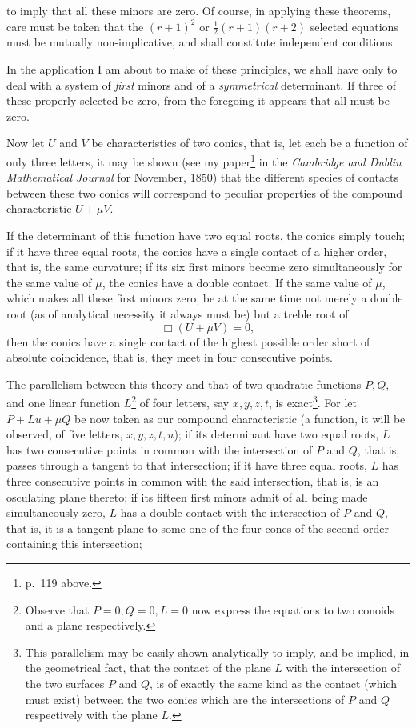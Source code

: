 \documentclass[11pt]{article}
\newcommand{\sourcepage}[1]{\marginpar{\scriptsize p.~#1}}
\begin{document}
{{\sourcepage{148}
to imply that all these minors are zero. Of course, in applying these theorems, care must be taken that the $(r+1)^2$ or $\frac12(r+1)(r+2)$ selected equations must be mutually non-implicative, and shall constitute independent conditions.

In the application I am about to make of these principles, we shall have only to deal with a system of \emph{first} minors and of a \emph{symmetrical} determinant. If three of these properly selected be zero, from the foregoing it appears that all must be zero.

Now let $U$ and $V$ be characteristics of two conics, that is, let each be a function of only three letters, it may be shown (see my paper\footnote{p.~119 above.} in the \emph{Cambridge and Dublin Mathematical Journal} for November, 1850) that the different species of contacts between these two conics will correspond to peculiar properties of the compound characteristic $U+\mu V$.

If the determinant of this function have two equal roots, the conics simply touch; if it have three equal roots, the conics have a single contact of a higher order, that is, the same curvature; if its six first minors become zero simultaneously for the same value of $\mu$, the conics have a double contact. If the same value of $\mu$, which makes all these first minors zero, be at the same time not merely a double root (as of analytical necessity it always must be) but a treble root of
\[
\Box(U+\mu V)=0,
\]
then the conics have a single contact of the highest possible order short of absolute coincidence, that is, they meet in four consecutive points.

The parallelism between this theory and that of two quadratic functions $P,Q$, and one linear function $L$\footnote{Observe that $P=0,Q=0,L=0$ now express the equations to two conoids and a plane respectively.} of four letters, say $x,y,z,t$, is exact\footnote{This parallelism may be easily shown analytically to imply, and be implied, in the geometrical fact, that the contact of the plane $L$ with the intersection of the two surfaces $P$ and $Q$, is of exactly the same kind as the contact (which must exist) between the two conics which are the intersections of $P$ and $Q$ respectively with the plane $L$.}. For let $P+Lu+\mu Q$ be now taken as our compound characteristic (a function, it will be observed, of five letters, $x,y,z,t,u$); if its determinant have two equal roots, $L$ has two consecutive points in common with the intersection of $P$ and $Q$, that is, passes through a tangent to that intersection; if it have three equal roots, $L$ has three consecutive points in common with the said intersection, that is, is an osculating plane thereto; if its fifteen first minors admit of all being made simultaneously zero, $L$ has a double contact with the intersection of $P$ and $Q$, that is, it is a tangent plane to some one of the four cones of the second order containing this intersection;

}}
\end{document}
